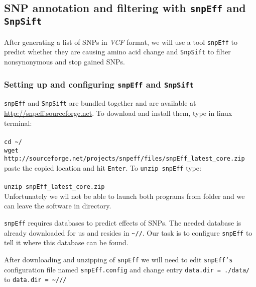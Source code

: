 \subsection{SNP annotation and filtering with \texttt{snpEff} and \texttt{SnpSift}}
After generating a list of SNPs in \textit{VCF} format,
we will use a tool \texttt{snpEff} to predict whether they are causing
amino acid change and \texttt{SnpSift} to filter nonsynonymous and stop gained SNPs.
\subsubsection{Setting up and configuring \texttt{snpEff} and \texttt{SnpSift}}
\texttt{snpEff} and \texttt{SnpSift} are bundled together and are available at \url{http://snpeff.sourceforge.net}.
To download and install them, type in linux terminal:\\~\\
\texttt{cd \textasciitilde/\progDir} \\
\texttt{wget http://sourceforge.net/projects/snpeff/files/snpEff\_latest\_core.zip} \\

paste the copied location and hit \texttt{Enter}. To \texttt{unzip snpEff} type:\\~\\
\texttt{unzip snpEff\_latest\_core.zip}\\

Unfortunately we wil not be able to launch both programs from \texttt{\binDir} folder
and we can leave the software in \texttt{\progDir} directory.

\texttt{snpEff} requires databases to predict effects of SNPs.
The needed database is already downloaded for us and resides in
\texttt{\textasciitilde/\dataDir/\snpEffData}. Our task is to 
configure \texttt{snpEff} to tell it where this database can be found.

After downloading and unzipping of \texttt{snpEff} we will need to
edit \texttt{snpEff's} configuration file named \texttt{snpEff.config}
and change entry \texttt{data.dir = ./data/} to \texttt{data.dir = \textasciitilde/\dataDir/\snpEffData/}

